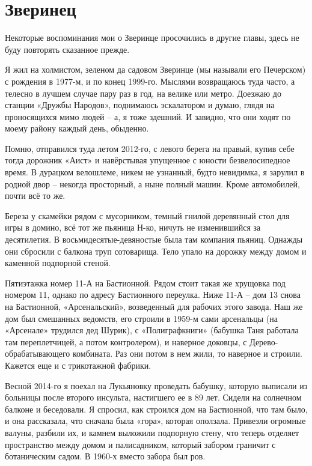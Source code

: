 \chapter{Зверинец}

Некоторые воспоминания мои о Зверинце просочились в другие главы, здесь не буду повторять сказанное прежде.

Я жил на холмистом, зеленом да садовом Зверинце (мы называли его Печерском) с рождения в 1977-м, и по конец 1999-го. Мыслями возвращаюсь туда часто, а телесно в лучшем случае пару раз в год, на велике или метро. Доезжаю до станции «Дружбы Народов», поднимаюсь эскалатором и думаю, глядя на проносящихся мимо людей – а, я тоже здешний. И завидно, что они ходят по моему району каждый день, обыденно.

Помню, отправился туда летом 2012-го, с левого берега на правый, купив себе тогда дорожник «Аист» и навёрстывая упущенное с юности безвелосипедное время. В дурацком велошлеме, никем не узнанный, будто невидимка, я зарулил в родной двор – некогда просторный, а ныне полный машин. Кроме автомобилей, почти всё то же.

Береза у скамейки рядом с мусорником, темный гнилой деревянный стол для игры в домино, всё тот же пьяница Н-ко, ничуть не изменившийся за десятилетия. В восьмидесятые-девяностые была там компания пьяниц. Однажды они сбросили с балкона труп сотоварища. Тело упало на дорожку между домом и каменной подпорной стеной.

Пятиэтажка номер 11-А на Бастионной. Рядом стоит такая же хрущовка под номером 11, однако по адресу Бастионного переулка. Ниже 11-А – дом 13 снова на Бастионной, «Арсенальский», возведенный для рабочих этого завода. Наш же дом был смешанных ведомств, его строили в 1959-м сами арсенальцы (на «Арсенале» трудился дед Шурик), с «Полиграфкниги» (бабушка Таня работала там переплетчицей, а потом контролером), и наверное доковцы, с Дерево-обрабатывающего комбината. Раз они потом в нем жили, то наверное и строили. Кажется еще и с трикотажной фабрики.

Весной 2014-го я поехал на Лукьяновку проведать бабушку, которую выписали из больницы после второго инсульта, настигшего ее в 89 лет. Сидели на солнечном балконе и беседовали. Я спросил, как строился дом на Бастионной, что там было, и она рассказала, что сначала была «гора», которая оползала. Привезли огромные валуны, разбили их, и камнем выложили подпорную стену, что теперь отделяет пространство между домом и палисадником, который забором граничит с ботаническим садом. В 1960-х вместо забора был ров.

